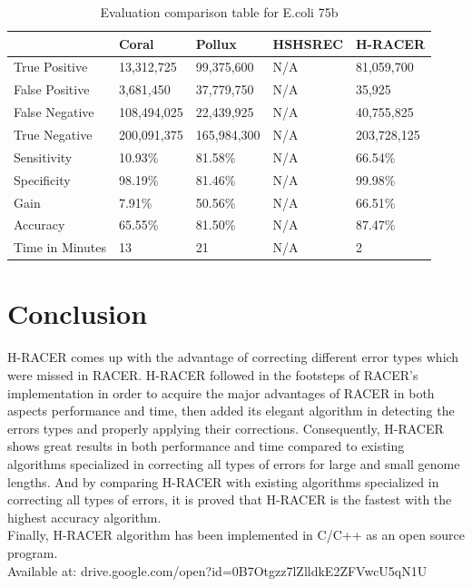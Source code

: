 \documentclass{llncs}
\newcommand{\TBstrut}{{\rule{0pt}{2ex}}{\rule[2ex]{0pt}{0pt}}} %
\begin{document}
\begin{longtable}{|m{33mm}|m{20mm}|m{20mm}|m{20mm}|m{20mm}|}
        \caption{\label{tab:eval-4}Evaluation comparison table for E.coli 75b}\\
        \hline
           & Coral & Pollux & HSHSREC & H-RACER\cellcolor{DarkGray} \TBstrut\\ %
        \hline
           True Positive & 13,312,725 & 99,375,600 & N/A & 81,059,700\cellcolor{LightGray} \TBstrut\\ %
        \hline
           False Positive & 3,681,450 & 37,779,750 & N/A & 35,925\cellcolor{LightGray} \TBstrut\\ %
        \hline
           False Negative & 108,494,025 & 22,439,925 & N/A & 40,755,825\cellcolor{LightGray} \TBstrut\\ %
        \hline
           True Negative & 200,091,375 & 165,984,300 & N/A & 203,728,125\cellcolor{LightGray} \TBstrut\\ %
        \hline
           Sensitivity & 10.93\% & 81.58\% & N/A & 66.54\%\cellcolor{LightGray} \TBstrut\\ %
        \hline
           Specificity & 98.19\% & 81.46\% & N/A & 99.98\%\cellcolor{LightGray} \TBstrut\\ %
        \hline
           Gain & 7.91\% & 50.56\% & N/A & 66.51\%\cellcolor{LightGray} \TBstrut\\ %
        \hline
           Accuracy & 65.55\% & 81.50\% & N/A & 87.47\%\cellcolor{LightGray} \TBstrut\\ %
        \hline
           Time in Minutes& 13 & 21 & N/A & 2\cellcolor{LightGray} \TBstrut\\ %
        \hline
\end{longtable}

\section{\label{sec:5}Conclusion}
H-RACER comes up with the advantage of correcting different error types which were missed in RACER. H-RACER followed in the footsteps of RACER's implementation in order to acquire the major advantages of RACER in both aspects performance and time, then added its elegant algorithm in detecting the errors types and properly applying their corrections. Consequently, H-RACER shows great results in both performance and time compared to existing algorithms specialized in correcting all types of errors for large and small genome lengths. And by comparing H-RACER with existing algorithms specialized in correcting all types of errors, it is proved that H-RACER is the fastest with the highest accuracy algorithm.
\\
Finally, H-RACER algorithm has been implemented in C/C++ as an open source program.
\\
Available at: drive.google.com/open?id=0B7Otgzz7lZlldkE2ZFVwcU5qN1U

 
\end{document}
